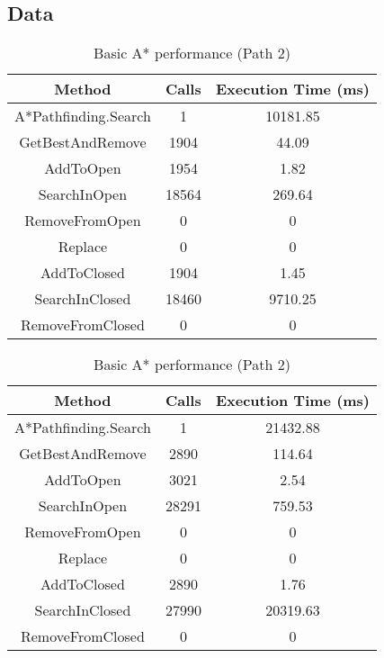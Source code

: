 \documentclass{article}
\begin{document}
  \subsection{Data}
  \begin{table}[h!]
      \parbox{.45\linewidth}{
        \centering
        \caption{Basic A* performance (Path 1)}
        \label{tab:tableA*1}
        \begin{tabular}{c|c|c}
          \textbf{Method} & \textbf{Calls} & \textbf{Execution Time (ms)}\\
          \hline
          A*Pathfinding.Search  & 1 & 10181.85\\
          GetBestAndRemove & 1904 & 44.09\\
          AddToOpen & 1954 & 1.82\\
          SearchInOpen & 18564 & 269.64\\
          RemoveFromOpen & 0 & 0\\
          Replace & 0 & 0\\
          AddToClosed & 1904  & 1.45\\
          SearchInClosed & 18460 & 9710.25\\
          RemoveFromClosed & 0 & 0\\
        \end{tabular}
      }
      \hfil
      \parbox{.45\linewidth}{
        \centering
        \caption{Basic A* performance (Path 2)}
        \label{tab:tableA*2}
        \begin{tabular}{c|c|c}
          \textbf{Method} & \textbf{Calls} & \textbf{Execution Time (ms)}\\
          \hline
          A*Pathfinding.Search  & 1 & 21432.88\\
          GetBestAndRemove & 2890 & 114.64\\
          AddToOpen & 3021 & 2.54\\
          SearchInOpen & 28291 & 759.53\\
          RemoveFromOpen & 0 & 0\\
          Replace & 0 & 0\\
          AddToClosed & 2890  & 1.76\\
          SearchInClosed & 27990 & 20319.63\\
          RemoveFromClosed & 0 & 0\\
        \end{tabular}
      }
  \end{table}
\end{document}

